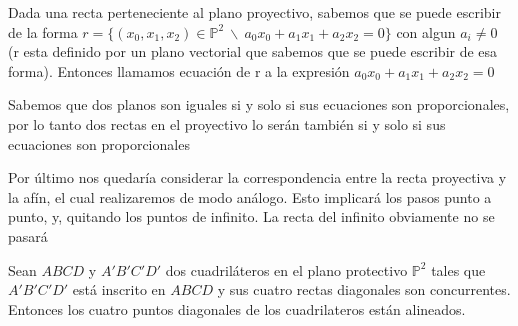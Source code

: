 \begin{ndef}
Dada una recta perteneciente al plano proyectivo, sabemos que se puede escribir de la forma $r = \{(x_0,x_1,x_2) \in \mathbb{P}^2\ \backslash\ a_0x_0+a_1x_1+a_2x_2 = 0\}$ con algun $a_i \neq 0$ (r esta definido por un plano vectorial que sabemos que se puede escribir de esa forma). Entonces llamamos ecuación de r a la expresión $a_0x_0+a_1x_1+a_2x_2 = 0$
\end{ndef}
Sabemos que dos planos son iguales si y solo si sus ecuaciones son proporcionales, por lo tanto dos rectas en el proyectivo lo serán también si y solo si sus ecuaciones son proporcionales

Por  último nos quedaría considerar la correspondencia entre la recta proyectiva y la afín, el cual realizaremos de modo análogo. Esto implicará los pasos punto a punto, y, quitando los puntos de infinito. La recta del infinito obviamente no se pasará

\begin{nth}
	Sean $ABCD$ y $A'B'C'D'$ dos cuadriláteros en el plano protectivo $\mathbb{P}^2$ tales que $A'B'C'D'$ está inscrito en $ABCD$ y sus cuatro rectas diagonales son concurrentes. Entonces  los cuatro puntos diagonales de los cuadrilateros están alineados.
\end{nth}

